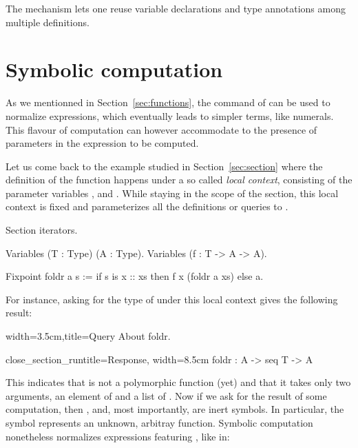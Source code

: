 The  mechanism lets one reuse variable declarations and type
annotations among multiple definitions.


\section{Symbolic computation}\label{sec:symcomp}

As we mentionned in Section~\ref{sec:functions}, the 
command of \Coq{} can be used to normalize expressions, which
eventually leads to simpler terms, like numerals. This flavour of
computation can however accommodate to the presence of parameters in
the expression to be computed.

Let us come back to the example studied in Section~\ref{sec:section} where
the definition of the  function happens under a so called
\emph{local context}, consisting of the parameter variables ,
 and . While staying in the scope of the 
section, this local context is fixed and parameterizes all the
definitions or queries to \Coq{}.

\begin{coq}{}{}
Section iterators.

Variables (T : Type) (A : Type).
Variables (f : T -> A -> A).

Fixpoint foldr a s :=
  if s is x :: xs then f x (foldr a xs) else a.
\end{coq}

For instance, asking for the type of
  under this local context gives the following result:

\begin{coq}{}{width=3.5cm,title=Query}
About foldr.
\end{coq}
\begin{coqout}{close_section_run}{title=Response, width=8.5cm}
foldr : A -> seq T -> A
\end{coqout}

This indicates that  is not a polymorphic function (yet)
and that it takes only two arguments, an element of  and
a list of . Now if we ask for the result of some computation,
then ,  and, most importantly,  are inert symbols.
In particular, the symbol  represents an unknown, arbitray
function. Symbolic computation nonetheless normalizes expressions
featuring , like in:

